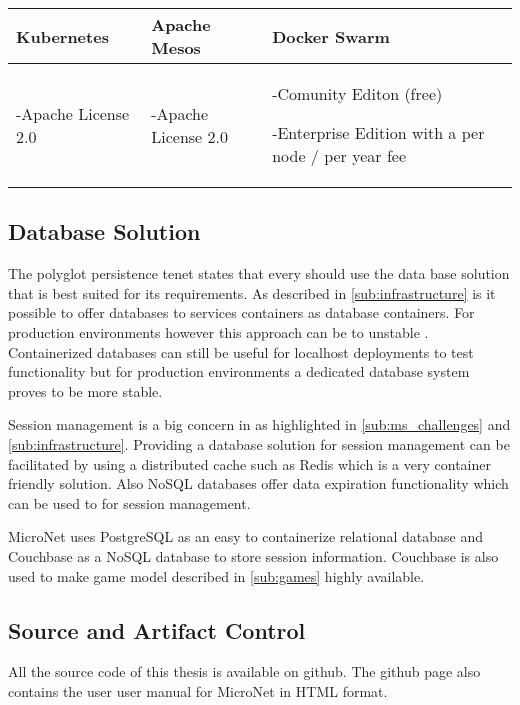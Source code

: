 \begin{center}
  \begin{tabular}{ | p{4.5cm} | p{4.5cm} | p{4.5cm} | }
    \hline
    \textbf{Kubernetes}&\textbf{Apache Mesos}&\textbf{Docker Swarm}\\\hline
    -Apache License 2.0 & 
    
    -Apache License 2.0 & 
    
    -Comunity Editon (free) 
    
    -Enterprise Edition with a per node / per year fee\\
    \hline
  \end{tabular}
\end{center}

\subsection{Database Solution}
\label{sub:database_solutions}

The polyglot persistence tenet states that every \ms{} should use the data base
solution that is best suited for its requirements. As described in
\autoref{sub:infrastructure} is it possible to offer databases to services
containers as database containers. For production environments however this
approach can be to unstable \cite{cazorla2017db_containers}. Containerized
databases can still be useful for localhost deployments to test functionality
but for production environments a dedicated database system proves to be more
stable.

Session management is a big concern in \og{} as highlighted in
\autoref{sub:ms_challenges} and \autoref{sub:infrastructure}. Providing a
database solution for session management can be facilitated by using a
distributed cache such as Redis which is a very container friendly solution.
Also NoSQL databases offer data expiration functionality which can be used
to for session management.

MicroNet uses PostgreSQL as an easy to containerize relational database and
Couchbase as a NoSQL database to store session information. Couchbase is also
used to make game model described in \autoref{sub:games} highly available.

\subsection{Source and Artifact Control}

All the source code of this thesis is available on
github\cite{micronet2017doku}. The github page also contains the user user
manual for MicroNet in HTML format.

